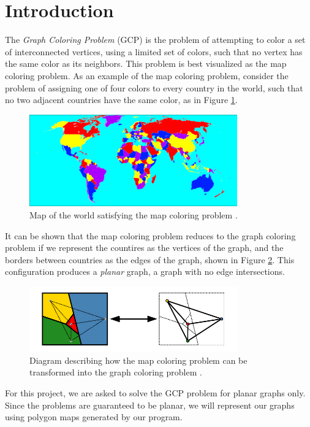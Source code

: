 \documentclass{article}
\begin{document}
\section{Introduction}
	The \textit{Graph Coloring Problem} (GCP) is the problem of attempting to color a set of interconnected vertices, using a limited set of colors, such that no vertex has the same color as its neighbors. This problem is best visualized as the map coloring problem. As an example of the map coloring problem, consider the problem of assigning one of four colors to every country in the world, such that no two adjacent countries have the same color, as in Figure \ref{world}. 
	\begin{figure}[h!]
		\centering
		\includegraphics[width=0.8\textwidth]{images/world_map}
		\caption{Map of the world satisfying the map coloring problem \cite{world}.}
		\label{world}
	\end{figure}
	It can be shown that the map coloring problem reduces to the graph coloring problem\cite{ai} if we represent the countires as the vertices of the graph, and the borders between countries as the edges of the graph, shown in Figure \ref{four_col}. This configuration produces a \textit{planar} graph, a graph with no edge intersections. 	
	\begin{figure}[h!]
		\centering
		\includegraphics[width=0.8\textwidth]{images/four_color}
		\caption{Diagram describing how the map coloring problem can be transformed into the graph coloring problem \cite{four_color}.}
		\label{four_col}
	\end{figure}
	For this project, we are asked to solve the GCP problem for planar graphs only. Since the problems are guaranteed to be planar, we will represent our graphs using polygon maps generated by our program.
	
\end{document}
